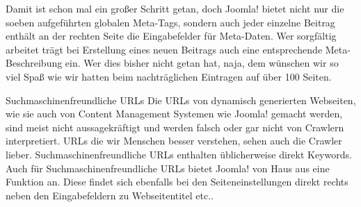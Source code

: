 Damit ist schon mal ein großer Schritt getan, doch Joomla! bietet nicht nur die soeben aufgeführten globalen Meta-Tags, sondern auch jeder einzelne Beitrag enthält an der rechten Seite die Eingabefelder für Meta-Daten. Wer sorgfältig arbeitet trägt bei Erstellung eines neuen Beitrags auch eine entsprechende Meta-Beschreibung ein. Wer dies bisher nicht getan hat, naja, dem wünschen wir so viel Spaß wie wir hatten beim nachträglichen Eintragen auf über 100 Seiten.


Suchmaschinenfreundliche URLs
Die URLs von dynamisch generierten Webseiten, wie sie auch von Content Management Systemen wie Joomla! gemacht werden, sind meist nicht aussagekräftigt und werden falsch oder gar nicht von Crawlern interpretiert. URLs die wir Menschen besser verstehen, sehen auch die Crawler lieber. Suchmaschinenfreundliche URLs enthalten üblicherweise direkt Keywords.
Auch für Suchmaschinenfreundliche URLs bietet Joomla! von Haus aus eine Funktion an. Diese findet sich ebenfalls bei den Seiteneinstellungen direkt rechts neben den Eingabefeldern zu Webseitentitel etc..

